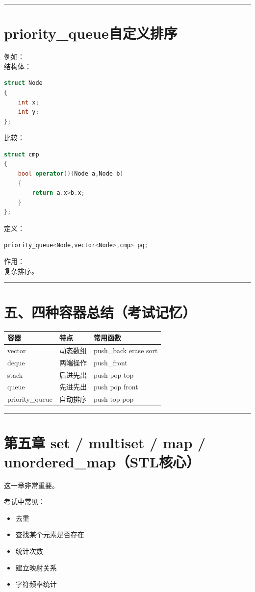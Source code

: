 \documentclass[10pt,twocolumn]{extarticle}
\begin{document}
\noindent\rule{\linewidth}{0.4pt}

\section{priority\_queue自定义排序}

例如：\\
结构体：
\begin{lstlisting}[language=C++]
struct Node
{
    int x;
    int y;
};
\end{lstlisting}
比较：
\begin{lstlisting}[language=C++]
struct cmp
{
    bool operator()(Node a,Node b)
    {
        return a.x>b.x;
    }
};
\end{lstlisting}
定义：
\begin{lstlisting}[language=C++]
priority_queue<Node,vector<Node>,cmp> pq;
\end{lstlisting}
作用：\\
复杂排序。

\noindent\rule{\linewidth}{0.4pt}

\section{五、四种容器总结（考试记忆）}

\begin{table}[h]
\centering
\begin{tabular}{|l|l|l|}
\hline
容器 & 特点 & 常用函数 \\ \hline
vector & 动态数组 & push\_back erase sort \\ \hline
deque & 两端操作 & push\_front \\ \hline
stack & 后进先出 & push pop top \\ \hline
queue & 先进先出 & push pop front \\ \hline
priority\_queue & 自动排序 & push top pop \\ \hline
\end{tabular}
\end{table}

\noindent\rule{\linewidth}{0.4pt}

\section{第五章 set / multiset / map / unordered\_map（STL核心）}

这一章非常重要。

考试中常见：
\begin{itemize}
    \item 去重
    \item 查找某个元素是否存在
    \item 统计次数
    \item 建立映射关系
    \item 字符频率统计
\end{itemize}
\end{document}
